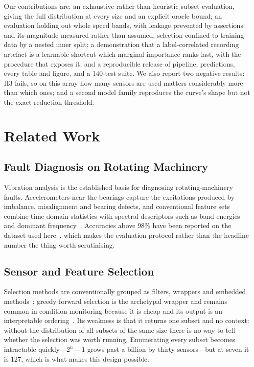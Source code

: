\documentclass[conference]{IEEEtran}
\begin{document}
Our contributions are: an exhaustive rather than heuristic subset evaluation,
giving the full distribution at every size and an explicit oracle bound; an
evaluation holding out whole speed bands, with leakage prevented by assertions
and its magnitude measured rather than assumed; selection confined to training
data by a nested inner split; a demonstration that a label-correlated recording
artefact is a learnable shortcut which marginal importance ranks last, with the
procedure that exposes it; and a reproducible release of pipeline, predictions,
every table and figure, and a 140-test suite. We also report two negative
results: H3 fails, so on this array how many sensors are used matters
considerably more than which ones; and a second model family reproduces the
curve's shape but not the exact reduction threshold.

\section{Related Work}


\subsection{Fault Diagnosis on Rotating Machinery}

Vibration analysis is the established basis for diagnosing rotating-machinery
faults. Accelerometers near the bearings capture the excitations produced by
imbalance, misalignment and bearing defects, and conventional feature sets
combine time-domain statistics with spectral descriptors such as band energies
and dominant frequency~\cite{lei2020, rauber2015}. Accuracies above 98\% have
been reported on the dataset used here~\cite{marins2018}, which makes the
evaluation protocol rather than the headline number the thing worth
scrutinising.

\subsection{Sensor and Feature Selection}

Selection methods are conventionally grouped as filters, wrappers and embedded
methods~\cite{guyon2003}; greedy forward selection is the archetypal wrapper
and remains common in condition monitoring because it is cheap and its output
is an interpretable ordering~\cite{rauber2015}. Its weakness is that it returns
one subset and no context: without the distribution of all subsets of the same
size there is no way to tell whether the selection was worth running.
Enumerating every subset becomes intractable quickly---$2^n-1$ grows past a
billion by thirty sensors---but at seven it is 127, which is what makes this
design possible.
\end{document}
